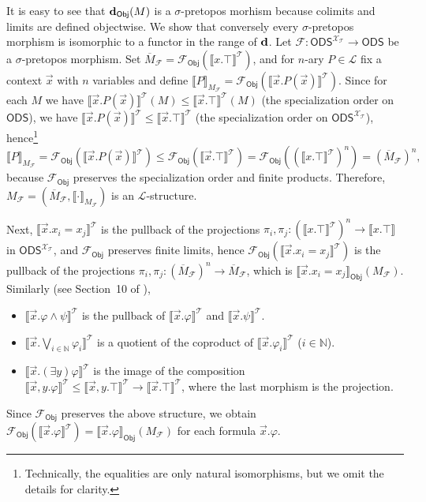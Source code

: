 \documentclass{article}
\theoremstyle{plain}
\def\cal#1{{\mathcal #1}}
\def\IN{{\mathbb N}}
\def\calF{{\cal F}}
\def\calL{{\cal L}}
\def\calT{{\cal T}}
\def\calX{{\cal X}}
\newcommand{\ODS}{{\mathsf{ODS}}}
\newcommand{\y}{{\mathsf{\bf d}}}
\newcommand{\Obj}{\mathsf{Obj}}
\begin{document}
It is easy to see that $\y_\Obj(M)$ is a $\sigma$-pretopos morhism because colimits and limits are defined objectwise. We show that conversely every $\sigma$-pretopos morphism is isomorphic to a functor in the range of $\y$. Let $\calF\colon \ODS^{\calX_\calT} \to \ODS$ be a $\sigma$-pretopos morphism. Set $\overline{M}_\calF = \calF_\Obj(\llbracket x.\top\rrbracket^\calT)$, and for $n$-ary $P\in\calL$ fix a context $\vec{x}$ with $n$ variables and define $\llbracket P \rrbracket_{M_\calF} = \calF_\Obj(\llbracket \vec{x}.P(\vec{x})\rrbracket^\calT)$. Since for each $M$ we have $\llbracket \vec{x}.P(\vec{x})\rrbracket^\calT(M) \leq \llbracket \vec{x}.\top\rrbracket^\calT(M)$ (the specialization order on $\ODS$), we have $\llbracket \vec{x}.P(\vec{x})\rrbracket^\calT \leq \llbracket \vec{x}.\top\rrbracket^\calT$ (the specialization order on $\ODS^{\calX_\calT}$), hence\footnote{Technically, the equalities are only natural isomorphisms, but we omit the details for clarity.}
\[\llbracket P \rrbracket_{M_\calF} =  \calF_\Obj(\llbracket \vec{x}.P(\vec{x})\rrbracket^\calT) \leq  \calF_\Obj(\llbracket \vec{x}.\top\rrbracket^\calT)=  \calF_\Obj((\llbracket x.\top\rrbracket^\calT)^n) = (\overline{M}_\calF)^n,\]
because $\calF_\Obj$ preserves the specialization order and finite products. Therefore, $M_\calF=(\overline{M}_\calF,\llbracket\cdot\rrbracket_{M_\calF})$ is an $\calL$-structure.

Next, $\llbracket \vec{x}.x_i = x_j\rrbracket^\calT$ is the pullback of the projections $\pi_i,\pi_j\colon (\llbracket x.\top\rrbracket^\calT)^n \to \llbracket x.\top\rrbracket$ in $\ODS^{\calX_\calT}$, and $\calF_\Obj$ preserves finite limits, hence  $\calF_\Obj(\llbracket \vec{x}.x_i = x_j\rrbracket^\calT)$ is the pullback of the projections $\pi_i,\pi_j\colon (\overline{M}_\calF)^n \to \overline{M}_\calF$, which is $\llbracket \vec{x}.x_i = x_j\rrbracket_\Obj( M_\calF)$. Similarly (see Section~10 of \cite{Chen19}), 
\begin{itemize}
\item
$\llbracket \vec{x}.\varphi \wedge \psi\rrbracket^\calT$ is the pullback of $\llbracket \vec{x}.\varphi \rrbracket^\calT$ and $\llbracket \vec{x}.\psi\rrbracket^\calT$.
\item
$\llbracket \vec{x}.\bigvee_{i\in\IN} \varphi_i\rrbracket^\calT$ is a quotient of the coproduct of $\llbracket \vec{x}. \varphi_i\rrbracket^\calT$ ($i\in\IN$).
\item
$\llbracket \vec{x}.(\exists y)  \varphi\rrbracket^\calT$ is the image of the composition $\llbracket \vec{x},y.  \varphi\rrbracket^\calT \leq \llbracket \vec{x},y.\top\rrbracket^\calT\to \llbracket \vec{x}.\top\rrbracket^\calT$, where the last morphism is the projection.
\end{itemize}
Since $\calF_\Obj$ preserves the above structure, we obtain $\calF_\Obj(\llbracket \vec{x}.\varphi\rrbracket^\calT) = \llbracket \vec{x}.\varphi\rrbracket_\Obj( M_\calF)$ for each formula $\vec{x}.\varphi$.
\end{document}
